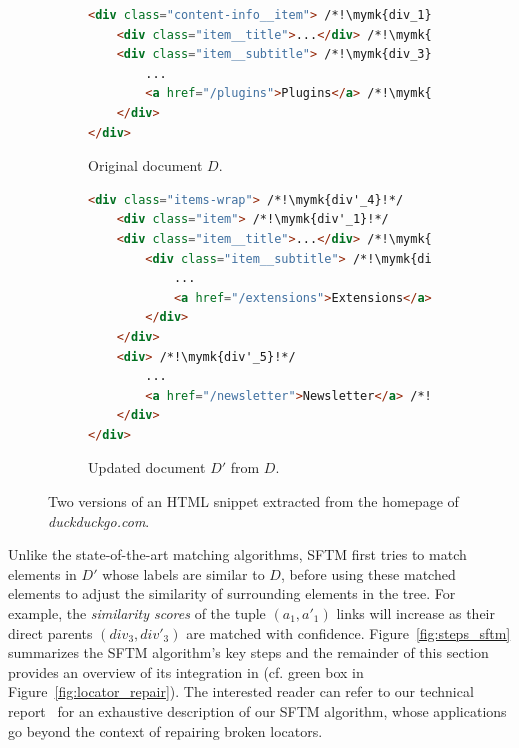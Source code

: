 \documentclass[preprint, 12pt]{elsarticle}
\newcommand{\mymk}[1]{%
  \tikz[baseline=(char.base)]\node[anchor=south west, draw, circle, inner sep=1pt, minimum size=4mm, text height=2mm](char){\ensuremath{#1}};}
\begin{document}
\begin{figure}
    \centering
    \begin{subfigure}[b]{\linewidth}
        \centering
        \caption{Original document $D$.}
        \begin{lstlisting}[language=html, label={fig:first_version}]
<div class="content-info__item"> /*!\mymk{div_1}!*/
    <div class="item__title">...</div> /*!\mymk{div_2}!*/
    <div class="item__subtitle"> /*!\mymk{div_3}!*/
        ... 
        <a href="/plugins">Plugins</a> /*!\mymk{~a_1~}!*/
    </div>
</div>
        \end{lstlisting}
    \end{subfigure}
    \hfill
    \begin{subfigure}[b]{\linewidth}
        \centering
        \caption{Updated document $D'$ from $D$.}
        \begin{lstlisting}[language=html, label={fig:second_version}]
<div class="items-wrap"> /*!\mymk{div'_4}!*/
    <div class="item"> /*!\mymk{div'_1}!*/
    <div class="item__title">...</div> /*!\mymk{div'_2}!*/
        <div class="item__subtitle"> /*!\mymk{div'_3}!*/
            ... 
            <a href="/extensions">Extensions</a> /*!\mymk{~a'_1~}!*/
        </div>
    </div>
    <div> /*!\mymk{div'_5}!*/  
        ...
        <a href="/newsletter">Newsletter</a> /*!\mymk{~a'_2~}!*/
    </div>
</div>
        \end{lstlisting}
    \end{subfigure}
    \caption{Two versions of an HTML snippet extracted from the homepage of \emph{duckduckgo.com}.}
    \label{fig:example_html}
\end{figure}

Unlike the state-of-the-art matching algorithms, SFTM first tries to match elements in $D'$ whose labels are similar to $D$, before using these matched elements to adjust the similarity of surrounding elements in the tree.
For example, the \emph{similarity scores} of the tuple $(a_1,a'_1)$ links will increase as their direct parents $(div_3,div'_3)$ are matched with confidence.
% 
Figure~\ref{fig:steps_sftm} summarizes the SFTM algorithm's key steps and the remainder of this section provides an overview of its integration in \erratum{} (cf. green box in Figure~\ref{fig:locator_repair}).
The interested reader can refer to our technical report~\cite{brisset2020sftm} for an exhaustive description of our SFTM algorithm, whose applications go beyond the context of repairing broken locators.
\end{document}
